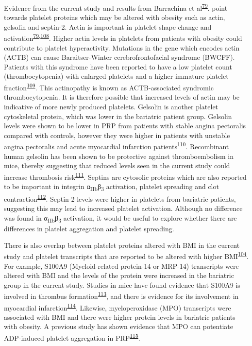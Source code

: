 \documentclass[11pt,twoside]{bristolthesis}
\begin{document}
Evidence from the current study and results from Barrachina et al\textsuperscript{\protect\hyperlink{ref-Barrachina2019}{79}}. point towards platelet proteins which may be altered with obesity such as actin, gelsolin and septin-2. Actin is important in platelet shape change and activation\textsuperscript{\protect\hyperlink{ref-Barrachina2019}{79},\protect\hyperlink{ref-Bearer2002}{108}}. Higher actin levels in platelets from patients with obesity could contribute to platelet hyperactivity. Mutations in the gene which encodes actin (ACTB) can cause Baraitser-Winter cerebrofrontofacial syndrome (BWCFF). Patients with this syndrome have been reported to have a low platelet count (thrombocytopenia) with enlarged platelets and a higher immature platelet fraction\textsuperscript{\protect\hyperlink{ref-Latham2018}{109}}. This actinopathy is known as ACTB-associated syndromic thrombocytopenia. It is therefore possible that increased levels of actin may be indicative of more newly produced platelets. Gelsolin is another platelet cytoskeletal protein, which was lower in the bariatric patient group. Gelsolin levels were shown to be lower in PRP from patients with stable angina pectoralis compared with controls, however they were higher in patients with unstable angina pectoralis and acute myocardial infarction patients\textsuperscript{\protect\hyperlink{ref-Yue2011}{110}}. Recombinant human gelsolin has been shown to be protective against thromboembolism in mice, thereby suggesting that reduced levels seen in the current study could increase thrombosis risk\textsuperscript{\protect\hyperlink{ref-Gupta2019}{111}}. Septins are cytosolic proteins which are also reported to be important in integrin α\textsubscript{IIb}β\textsubscript{3} activation, platelet spreading and clot contraction\textsuperscript{\protect\hyperlink{ref-Kim2020}{112}}. Septin-2 levels were higher in platelets from bariatric patients, suggesting this may lead to increased platelet activation. Although no difference was found in α\textsubscript{IIb}β\textsubscript{3} activation, it would be useful to explore whether there are differences in platelet aggregation and platelet spreading.

There is also overlap between platelet proteins altered with BMI in the current study and platelet transcripts that are reported to be altered with higher BMI\textsuperscript{\protect\hyperlink{ref-Freedman2010}{104}}. For example, S100A9 (Myeloid-related protein-14 or MRP-14) transcripts were altered with BMI and the levels of the protein were increased in the bariatric group in the current study. Studies in mice have found evidence that S100A9 is involved in thrombus formation\textsuperscript{\protect\hyperlink{ref-Wang2014a}{113}}, and there is evidence for its involvement in myocardial infarction\textsuperscript{\protect\hyperlink{ref-Cai2020}{114}}. Likewise, myeloperoxidase (MPO) transcripts were associated with BMI and there were higher protein levels in bariatric patients with obesity. A previous study has shown evidence that MPO can potentiate ADP-induced platelet aggregation in PRP\textsuperscript{\protect\hyperlink{ref-Gorudko2013}{115}}.
\end{document}

